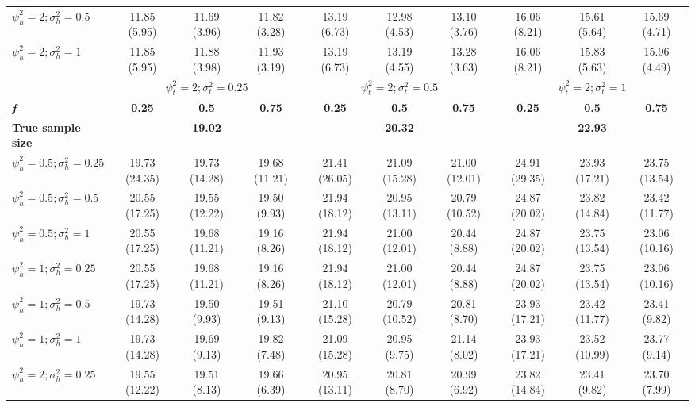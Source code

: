 \documentclass[11pt]{article}
\begin{document}
\begin{landscape}
\begin{table}[]
{\begin{tabular}{l c c c c c c c c c}
          $\psi_h^2 = 2; \sigma_h^2 = 0.5$ & 11.85 (5.95) & 11.69 (3.96) & 11.82 (3.28) & 13.19 (6.73) & 12.98 (4.53) & 13.10 (3.76) & 16.06 (8.21) & 15.61 (5.64) & 15.69 (4.71) \\
          $\psi_h^2 = 2; \sigma_h^2 = 1$ & 11.85 (5.95) & 11.88 (3.98) & 11.93 (3.19) & 13.19 (6.73) & 13.19 (4.55) & 13.28 (3.63) & 16.06 (8.21) & 15.83 (5.63) & 15.96 (4.49) \\
          \hline 
          & \multicolumn{3}{c}{$\psi_t^2 = 2; \sigma_t^2 = 0.25$} & \multicolumn{3}{c}{$\psi_t^2 = 2; \sigma_t^2 = 0.5$} & \multicolumn{3}{c}{$\psi_t^2 = 2; \sigma_t^2 = 1$} \\
          \cline{2-10}
          \textbf{\textit{f}} & \textbf{0.25} & \textbf{0.5} & \textbf{0.75} & \textbf{0.25} & \textbf{0.5} & \textbf{0.75} & \textbf{0.25} & \textbf{0.5} & \textbf{0.75} \\
          \hline
          \textbf{True sample size} & \multicolumn{3}{c}{\textbf{19.02}} & \multicolumn{3}{c}{\textbf{20.32}} & \multicolumn{3}{c}{\textbf{22.93}} \\
          $\psi_h^2 = 0.5; \sigma_h^2 = 0.25$ & 19.73 (24.35) & 19.73 (14.28) & 19.68 (11.21) & 21.41 (26.05) & 21.09 (15.28) & 21.00 (12.01) & 24.91 (29.35) & 23.93 (17.21) & 23.75 (13.54) \\
          $\psi_h^2 = 0.5; \sigma_h^2 = 0.5$ & 20.55 (17.25) & 19.55 (12.22) & 19.50 (9.93) & 21.94 (18.12) & 20.95 (13.11) & 20.79 (10.52) & 24.87 (20.02) & 23.82 (14.84) & 23.42 (11.77) \\
          $\psi_h^2 = 0.5; \sigma_h^2 = 1$ & 20.55 (17.25) & 19.68 (11.21) & 19.16 (8.26) & 21.94 (18.12) & 21.00 (12.01) & 20.44 (8.88) & 24.87 (20.02) & 23.75 (13.54) & 23.06 (10.16) \\
          $\psi_h^2 = 1; \sigma_h^2 = 0.25$ & 20.55 (17.25) & 19.68 (11.21) & 19.16 (8.26) & 21.94 (18.12) & 21.00 (12.01) & 20.44 (8.88) & 24.87 (20.02) & 23.75 (13.54) & 23.06 (10.16) \\
          $\psi_h^2 = 1; \sigma_h^2 = 0.5$ & 19.73 (14.28) & 19.50 (9.93) & 19.51 (9.13) & 21.10 (15.28) & 20.79 (10.52) & 20.81 (8.70) & 23.93 (17.21) & 23.42 (11.77) & 23.41 (9.82) \\
          $\psi_h^2 = 1; \sigma_h^2 = 1$ & 19.73 (14.28) & 19.69 (9.13) & 19.82 (7.48) & 21.09 (15.28) & 20.95 (9.75) & 21.14 (8.02) & 23.93 (17.21) & 23.52 (10.99) & 23.77 (9.14) \\
          $\psi_h^2 = 2; \sigma_h^2 = 0.25$ & 19.55 (12.22) & 19.51 (8.13) & 19.66 (6.39) & 20.95 (13.11) & 20.81 (8.70) & 20.99 (6.92) & 23.82 (14.84) & 23.41 (9.82) & 23.70 (7.99) \\

\end{tabular}}
\end{table}
\end{landscape}
\end{document}
